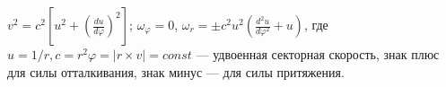 $v^2=c^2[u^2+(\frac{du}{d\varphi})^2]$; $\omega_{\varphi}=0$, $\omega_{r}=\pm c^2u^2(\frac{d^2u}{d\varphi^2}+u)$,
где $u=1/r, c=r^2\varphi=|r\times v|=const$ --- удвоенная секторная скорость, знак плюс для силы отталкивания, знак минус --- 
для силы притяжения.
